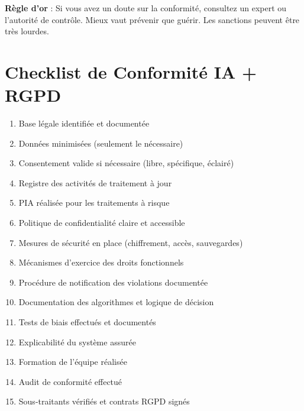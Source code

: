 \documentclass[11pt,a4paper]{article}
\begin{document}
\begin{importantbox}
\textbf{Règle d'or} : Si vous avez un doute sur la conformité, consultez un expert ou l'autorité de contrôle. Mieux vaut prévenir que guérir. Les sanctions peuvent être très lourdes.
\end{importantbox}

\section{Checklist de Conformité IA + RGPD}

\begin{enumerate}
    \item[$\square$] Base légale identifiée et documentée
    \item[$\square$] Données minimisées (seulement le nécessaire)
    \item[$\square$] Consentement valide si nécessaire (libre, spécifique, éclairé)
    \item[$\square$] Registre des activités de traitement à jour
    \item[$\square$] PIA réalisée pour les traitements à risque
    \item[$\square$] Politique de confidentialité claire et accessible
    \item[$\square$] Mesures de sécurité en place (chiffrement, accès, sauvegardes)
    \item[$\square$] Mécanismes d'exercice des droits fonctionnels
    \item[$\square$] Procédure de notification des violations documentée
    \item[$\square$] Documentation des algorithmes et logique de décision
    \item[$\square$] Tests de biais effectués et documentés
    \item[$\square$] Explicabilité du système assurée
    \item[$\square$] Formation de l'équipe réalisée
    \item[$\square$] Audit de conformité effectué
    \item[$\square$] Sous-traitants vérifiés et contrats RGPD signés
\end{enumerate}
\end{document}
